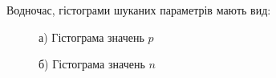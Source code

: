 \documentclass[a4paper,14pt]{extarticle} %
\numberwithin{equation}{section}
\begin{document}
Водночас, гістограми шуканих параметрів мають вид:

\begin{figure}[H]
    \begin{minipage}[H]{0.49\linewidth}
        а) Гістограма значень $p$
    \end{minipage}
    \hfill
    \begin{minipage}[H]{0.49\linewidth}
        б) Гістограма значень $n$
    \end{minipage}
\end{figure}
\end{document}
